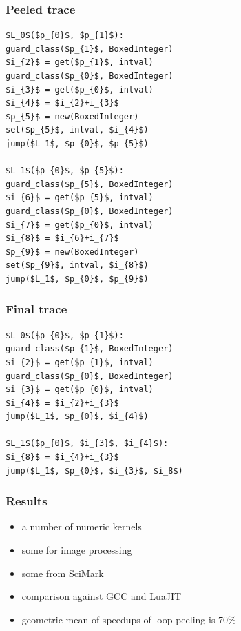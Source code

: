 \documentclass[utf8x]{beamer}
\begin{document}
\begin{frame}[fragile]
  \frametitle{Peeled trace}
\begin{lstlisting}[mathescape]
$L_0$($p_{0}$, $p_{1}$):
guard_class($p_{1}$, BoxedInteger)
$i_{2}$ = get($p_{1}$, intval)
guard_class($p_{0}$, BoxedInteger)
$i_{3}$ = get($p_{0}$, intval)
$i_{4}$ = $i_{2}+i_{3}$
$p_{5}$ = new(BoxedInteger)
set($p_{5}$, intval, $i_{4}$)
jump($L_1$, $p_{0}$, $p_{5}$)

$L_1$($p_{0}$, $p_{5}$):
guard_class($p_{5}$, BoxedInteger)
$i_{6}$ = get($p_{5}$, intval)
guard_class($p_{0}$, BoxedInteger)
$i_{7}$ = get($p_{0}$, intval)
$i_{8}$ = $i_{6}+i_{7}$
$p_{9}$ = new(BoxedInteger)
set($p_{9}$, intval, $i_{8}$)
jump($L_1$, $p_{0}$, $p_{9}$)
\end{lstlisting}
\end{frame}

\begin{frame}[fragile]
  \frametitle{Final trace}
\begin{lstlisting}[mathescape]
$L_0$($p_{0}$, $p_{1}$):
guard_class($p_{1}$, BoxedInteger)
$i_{2}$ = get($p_{1}$, intval)
guard_class($p_{0}$, BoxedInteger)
$i_{3}$ = get($p_{0}$, intval)
$i_{4}$ = $i_{2}+i_{3}$
jump($L_1$, $p_{0}$, $i_{4}$)

$L_1$($p_{0}$, $i_{3}$, $i_{4}$):
$i_{8}$ = $i_{4}+i_{3}$
jump($L_1$, $p_{0}$, $i_{3}$, $i_8$)
\end{lstlisting}
\end{frame}



\begin{frame}
  \frametitle{Results}
  \begin{itemize}
      \item a number of numeric kernels
      \item some for image processing
      \item some from SciMark
      \item comparison against GCC and LuaJIT
      \pause
      \item geometric mean of speedups of loop peeling is 70\%
  \end{itemize}
\end{frame}
\end{document}
